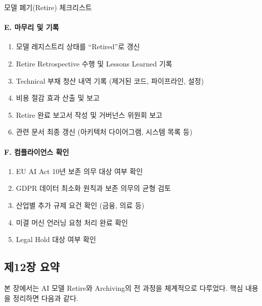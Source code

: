 \begin{practicaltool}{모델 폐기(Retire) 체크리스트}
\paragraph{E. 마무리 및 기록}
\begin{enumerate}
 \item[$\square$] 모델 레지스트리 상태를 ``Retired''로 갱신
 \item[$\square$] Retire Retrospective 수행 및 Lessons Learned 기록
 \item[$\square$] Technical 부채 청산 내역 기록 (제거된 코드, 파이프라인, 설정)
 \item[$\square$] 비용 절감 효과 산출 및 보고
 \item[$\square$] Retire 완료 보고서 작성 및 거버넌스 위원회 보고
 \item[$\square$] 관련 문서 최종 갱신 (아키텍처 다이어그램, 시스템 목록 등)
\end{enumerate}

\paragraph{F. 컴플라이언스 확인}
\begin{enumerate}
 \item[$\square$] EU AI Act 10년 보존 의무 대상 여부 확인
 \item[$\square$] GDPR 데이터 최소화 원칙과 보존 의무의 균형 검토
 \item[$\square$] 산업별 추가 규제 요건 확인 (금융, 의료 등)
 \item[$\square$] 미결 머신 언러닝 요청 처리 완료 확인
 \item[$\square$] Legal Hold 대상 여부 확인
\end{enumerate}
\end{practicaltool}


\subsection*{제12장 요약}

본 장에서는 AI 모델 Retire와 Archiving의 전 과정을 체계적으로 다루었다. 핵심 내용을 정리하면 다음과 같다.


